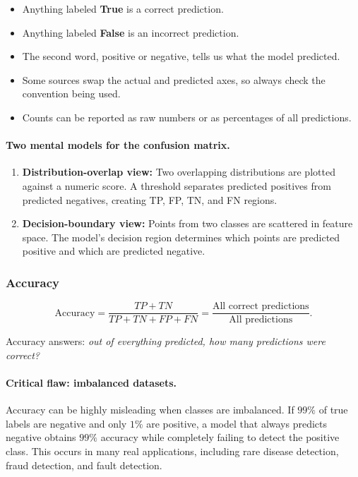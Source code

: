 \documentclass[12pt,openany]{book}
\begin{document}
\begin{itemize}[leftmargin=*]
    \item Anything labeled \textbf{True} is a correct prediction.
    \item Anything labeled \textbf{False} is an incorrect prediction.
    \item The second word, positive or negative, tells us what the model predicted.
    \item Some sources swap the actual and predicted axes, so always check the convention being used.
    \item Counts can be reported as raw numbers or as percentages of all predictions.
\end{itemize}

\paragraph{Two mental models for the confusion matrix.}
\begin{enumerate}[leftmargin=*]
    \item \textbf{Distribution-overlap view:} Two overlapping distributions are plotted against a numeric score. A threshold separates predicted positives from predicted negatives, creating TP, FP, TN, and FN regions.
    \item \textbf{Decision-boundary view:} Points from two classes are scattered in feature space. The model's decision region determines which points are predicted positive and which are predicted negative.
\end{enumerate}

\subsubsection{Accuracy}

\begin{equation*}
    \text{Accuracy}
    = \frac{TP+TN}{TP+TN+FP+FN}
    = \frac{\text{All correct predictions}}{\text{All predictions}}.
\end{equation*}

Accuracy answers: \textit{out of everything predicted, how many predictions were correct?}

\paragraph{Critical flaw: imbalanced datasets.}
Accuracy can be highly misleading when classes are imbalanced. If \(99\%\) of true labels are negative and only \(1\%\) are positive, a model that always predicts negative obtains \(99\%\) accuracy while completely failing to detect the positive class. This occurs in many real applications, including rare disease detection, fraud detection, and fault detection.
\end{document}
